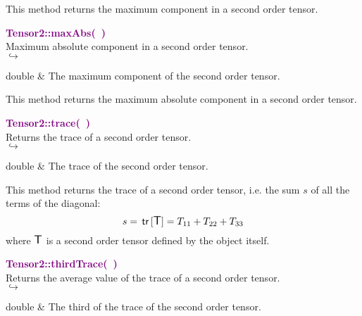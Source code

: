 This method returns the maximum component in a second order tensor.

\textcolor{purple}{\textbf{Tensor2::maxAbs(~)}}\label{Tensor2::maxAbs()}\\
Maximum absolute component in a second order tensor.\\ \hspace*{5mm}$\hookrightarrow$
\vspace*{-2em}\begin{tcolorbox}[grow to left by=-1cm, width=\textwidth-1cm,myArgs,tabularx={l|R}]
double & The maximum component of the second order tensor.
\end{tcolorbox}

This method returns the maximum absolute component in a second order tensor.

\textcolor{purple}{\textbf{Tensor2::trace(~)}}\label{Tensor2::trace()}\\
Returns the trace of a second order tensor.\\ \hspace*{5mm}$\hookrightarrow$
\vspace*{-2em}\begin{tcolorbox}[grow to left by=-1cm, width=\textwidth-1cm,myArgs,tabularx={l|R}]
double & The trace of the second order tensor.
\end{tcolorbox}

This method returns the trace of a second order tensor, i.e. the sum $s$ of all the terms of the diagonal:
\begin{equation*}
s = \mbox{\ensuremath{\mathsf{\,tr\,}}}[\mbox{\large\ensuremath{\mathsf{T}}}] = T_{11}+T_{22}+T_{33}
\end{equation*}
where $\mbox{\large\ensuremath{\mathsf{T}}}$ is a second order tensor defined by the object itself.

\textcolor{purple}{\textbf{Tensor2::thirdTrace(~)}}\label{Tensor2::thirdTrace()}\\
Returns the average value of the trace of a second order tensor.\\ \hspace*{5mm}$\hookrightarrow$
\vspace*{-2em}\begin{tcolorbox}[grow to left by=-1cm, width=\textwidth-1cm,myArgs,tabularx={l|R}]
double & The third of the trace of the second order tensor.
\end{tcolorbox}

